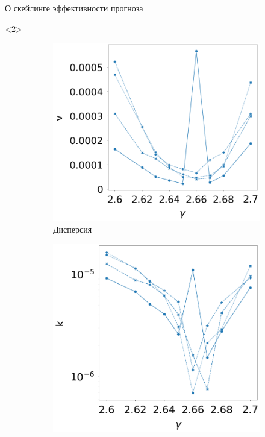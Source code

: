 \documentclass{beamer}
\begin{document}
\begin{frame}{О скейлинге эффективности прогноза}
		\begin{onlyenv}<2>
			\begin{figure}[h]
				\centering
				\hspace{-15mm}
				\begin{subfigure}[t]{0.27\textwidth}
					\centering
					\includegraphics[height=\textwidth]{images/var_manna}
					\caption{Дисперсия}
				\end{subfigure}
				\hspace{5mm}
				\begin{subfigure}[t]{0.27\textwidth}
					\centering
					\includegraphics[height=\textwidth]{images/k_manna}

\end{subfigure}
\end{figure}
\end{onlyenv}
\end{frame}
\end{document}

